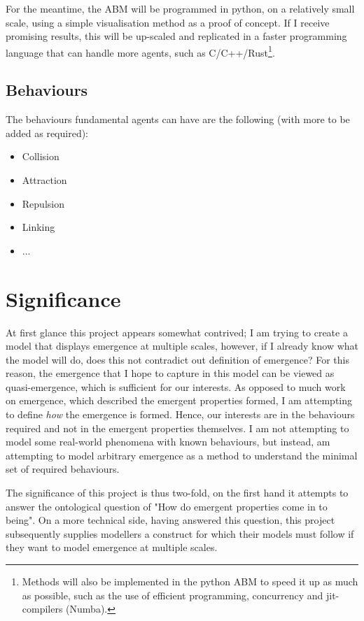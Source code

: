 \documentclass{article}
\begin{document}
    For the meantime, the ABM will be programmed in python, on a relatively small scale, using a simple visualisation method as a proof of concept. If I receive promising results, this will be up-scaled and replicated in a faster programming language that can handle more agents, such as C/C++/Rust\footnote{Methods will also be implemented in the python ABM to speed it up as much as possible, such as the use of efficient programming, concurrency and jit-compilers (Numba).}. 

    \subsection{Behaviours}
      
      The behaviours fundamental agents can have are the following (with more to be added as required):

      \begin{itemize}
        \item Collision
        \item Attraction
        \item Repulsion
        \item Linking
        \item ...
      \end{itemize}


\section{Significance}

  At first glance this project appears somewhat contrived; I am trying to create a model that displays emergence at multiple scales, however, if I already know what the model will do, does this not contradict out definition of emergence? For this reason, the emergence that I hope to capture in this model can be viewed as quasi-emergence, which is sufficient for our interests. As opposed to much work on emergence, which described the emergent properties formed, I am attempting to define \textit{how} the emergence is formed. Hence, our interests are in the behaviours required and not in the emergent properties themselves. I am not attempting to model some real-world phenomena with known behaviours, but instead, am attempting to model arbitrary emergence as a method to understand the minimal set of required behaviours. 

  The significance of this project is thus two-fold, on the first hand it attempts to answer the ontological question of "How do emergent properties come in to being". On a more technical side, having answered this question, this project subsequently supplies modellers a construct for which their models must follow if they want to model emergence at multiple scales.
\end{document}
